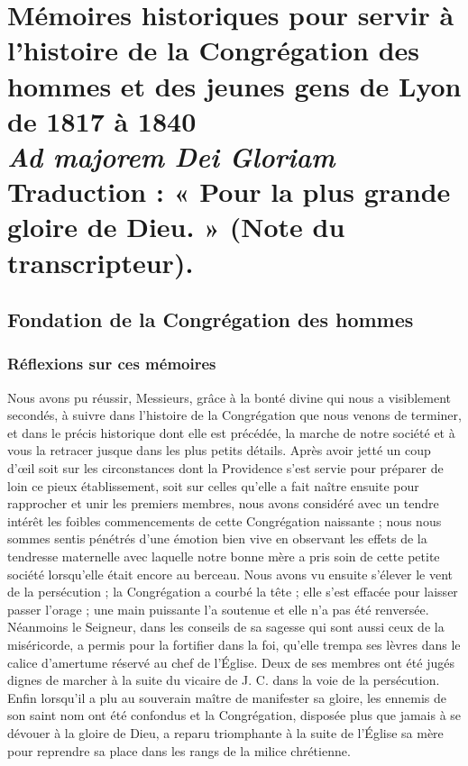 \part*{Mémoires historiques pour servir à l'histoire de la Congrégation des hommes et des jeunes gens de Lyon de 1817 à 1840\\[1em]{\normalfont\large\textit{Ad majorem Dei Gloriam}}\\[0.5em]{\normalfont\small Traduction : « Pour la plus grande gloire de Dieu. » (Note du transcripteur).}}
\setcounter{chapter}{0}
\renewcommand{\theHchapter}{memoires.\arabic{chapter}}
\chapter{Fondation de la Congrégation des hommes}

\section*{Réflexions sur ces mémoires}
Nous avons pu réussir, Messieurs, grâce à la bonté divine qui nous a visiblement secondés, à suivre dans l'histoire de la Congrégation que nous venons de terminer, et dans le précis historique dont elle est précédée, la marche de notre société et à vous la retracer jusque dans les plus petits détails. Après avoir jetté un coup d'œil soit sur les circonstances dont la Providence s'est servie pour préparer de loin ce pieux établissement, soit sur celles qu'elle a fait naître ensuite pour rapprocher et unir les premiers membres, nous avons considéré avec un tendre intérêt les foibles commencements de cette Congrégation naissante ; nous nous sommes sentis pénétrés d'une émotion bien vive en observant les effets de la tendresse maternelle avec laquelle notre bonne mère a pris soin de cette petite société lorsqu'elle était encore au berceau. Nous avons vu ensuite s'élever le vent de la persécution ; la Congrégation a courbé la tête ; elle s'est effacée pour laisser passer l'orage ; une main puissante l'a soutenue et elle n'a pas été renversée. Néanmoins le Seigneur, dans les conseils de sa sagesse qui sont aussi ceux de la miséricorde, a permis
pour la fortifier dans la foi, qu'elle trempa ses lèvres dans le calice d'amertume réservé au chef de l'Église. Deux de ses membres ont été jugés dignes de marcher à la suite du vicaire de J. C. dans la voie de la persécution. Enfin lorsqu'il a plu au souverain maître de manifester sa gloire, les ennemis de son saint nom ont été confondus et la Congrégation, disposée plus que jamais à se dévouer à la gloire de Dieu, a reparu triomphante à la suite de l'Église sa mère pour reprendre sa place dans les rangs de la milice chrétienne.

